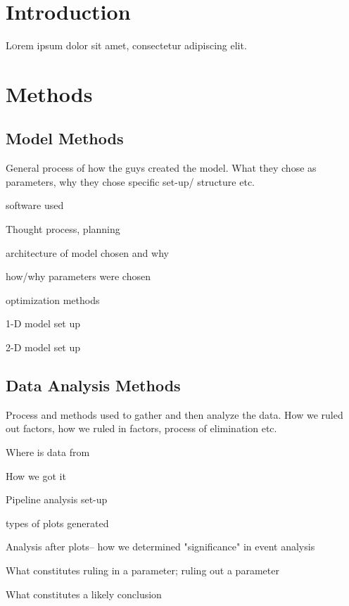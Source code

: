 \documentclass[twoside]{article}
\begin{document}
	\begin{multicols}{2} %
		
		\section{Introduction}
		
		\lettrine[nindent=0em,lines=3]{L} orem ipsum dolor sit amet, consectetur adipiscing elit.
		\lipsum[2-3] %
		
		
		\section{Methods}
		
		\subsection{Model Methods}
		General process of how the guys created the model. What they chose as parameters, why they chose specific set-up/ structure etc. 
		\begin{compactitem}
			\item software used
			\item Thought process, planning
			\item architecture of model chosen and why 
			\item how/why parameters were chosen 
			\item optimization methods
			\item 1-D model set up
			\item 2-D model set up
		\end{compactitem}
		
		\subsection{Data Analysis Methods}
		Process and methods used to gather and then analyze the data. How we ruled out factors, how we ruled in factors, process of elimination etc. 
		\begin{compactitem}
			\item Where is data from
			\item How we got it
			\item Pipeline analysis set-up
			\item types of plots generated
			\item Analysis after plots-- how we determined "significance" in event analysis
			\item What constitutes ruling in a parameter; ruling out a parameter 
			\item What constitutes a likely conclusion
		\end{compactitem}
		

\end{multicols}
\end{document}
